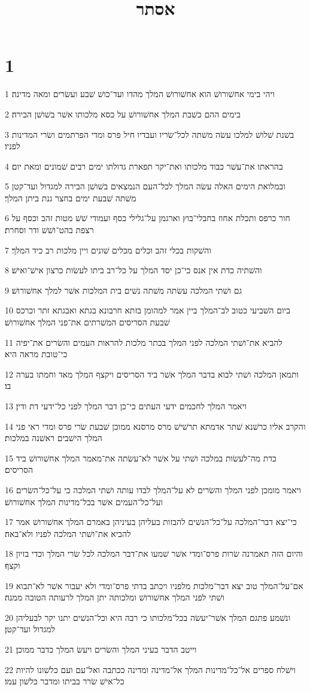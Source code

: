 

\title{אסתר}


\chapter{1}

\par 1 ויהי בימי אחשׁורושׁ הוא אחשׁורושׁ המלך מהדו ועד־כושׁ שׁבע ועשׂרים ומאה מדינה׃
\par 2 בימים ההם כשׁבת המלך אחשׁורושׁ על כסא מלכותו אשׁר בשׁושׁן הבירה׃
\par 3 בשׁנת שׁלושׁ למלכו עשׂה משׁתה לכל־שׂריו ועבדיו חיל פרס ומדי הפרתמים ושׂרי המדינות לפניו׃
\par 4 בהראתו את־עשׁר כבוד מלכותו ואת־יקר תפארת גדולתו ימים רבים שׁמונים ומאת יום׃
\par 5 ובמלואת הימים האלה עשׂה המלך לכל־העם הנמצאים בשׁושׁן הבירה למגדול ועד־קטן משׁתה שׁבעת ימים בחצר גנת ביתן המלך׃
\par 6 חור כרפס ותכלת אחוז בחבלי־בוץ וארגמן על־גלילי כסף ועמודי שׁשׁ מטות זהב וכסף על רצפת בהט־ושׁשׁ ודר וסחרת׃
\par 7 והשׁקות בכלי זהב וכלים מכלים שׁונים ויין מלכות רב כיד המלך׃
\par 8 והשׁתיה כדת אין אנס כי־כן יסד המלך על כל־רב ביתו לעשׂות כרצון אישׁ־ואישׁ׃
\par 9 גם ושׁתי המלכה עשׂתה משׁתה נשׁים בית המלכות אשׁר למלך אחשׁורושׁ׃
\par 10 ביום השׁביעי כטוב לב־המלך ביין אמר למהומן בזתא חרבונא בגתא ואבגתא זתר וכרכס שׁבעת הסריסים המשׁרתים את־פני המלך אחשׁורושׁ׃
\par 11 להביא את־ושׁתי המלכה לפני המלך בכתר מלכות להראות העמים והשׂרים את־יפיה כי־טובת מראה היא׃
\par 12 ותמאן המלכה ושׁתי לבוא בדבר המלך אשׁר ביד הסריסים ויקצף המלך מאד וחמתו בערה בו׃
\par 13 ויאמר המלך לחכמים ידעי העתים כי־כן דבר המלך לפני כל־ידעי דת ודין׃
\par 14 והקרב אליו כרשׁנא שׁתר אדמתא תרשׁישׁ מרס מרסנא ממוכן שׁבעת שׂרי פרס ומדי ראי פני המלך הישׁבים ראשׁנה במלכות׃
\par 15 כדת מה־לעשׂות במלכה ושׁתי על אשׁר לא־עשׂתה את־מאמר המלך אחשׁורושׁ ביד הסריסים׃
\par 16 ויאמר מומכן לפני המלך והשׂרים לא על־המלך לבדו עותה ושׁתי המלכה כי על־כל־השׂרים ועל־כל־העמים אשׁר בכל־מדינות המלך אחשׁורושׁ׃
\par 17 כי־יצא דבר־המלכה על־כל־הנשׁים להבזות בעליהן בעיניהן באמרם המלך אחשׁורושׁ אמר להביא את־ושׁתי המלכה לפניו ולא־באה׃
\par 18 והיום הזה תאמרנה שׂרות פרס־ומדי אשׁר שׁמעו את־דבר המלכה לכל שׂרי המלך וכדי בזיון וקצף׃
\par 19 אם־על־המלך טוב יצא דבר־מלכות מלפניו ויכתב בדתי פרס־ומדי ולא יעבור אשׁר לא־תבוא ושׁתי לפני המלך אחשׁורושׁ ומלכותה יתן המלך לרעותה הטובה ממנה׃
\par 20 ונשׁמע פתגם המלך אשׁר־יעשׂה בכל־מלכותו כי רבה היא וכל־הנשׁים יתנו יקר לבעליהן למגדול ועד־קטן׃
\par 21 וייטב הדבר בעיני המלך והשׂרים ויעשׂ המלך כדבר ממוכן׃
\par 22 וישׁלח ספרים אל־כל־מדינות המלך אל־מדינה ומדינה ככתבה ואל־עם ועם כלשׁונו להיות כל־אישׁ שׂרר בביתו ומדבר כלשׁון עמו׃

